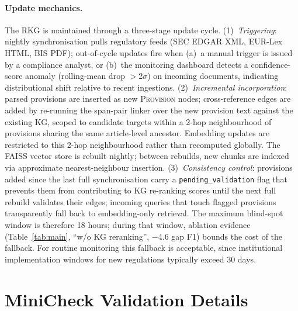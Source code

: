 \documentclass[11pt]{article}
\begin{document}
\paragraph{Update mechanics.}  The RKG is maintained through a three-stage update cycle. (1)~\emph{Triggering}: nightly synchronisation pulls regulatory feeds (SEC EDGAR XML, EUR-Lex HTML, BIS PDF); out-of-cycle updates fire when (a)~a manual trigger is issued by a compliance analyst, or (b)~the monitoring dashboard detects a confidence-score anomaly (rolling-mean drop $>$2$\sigma$) on incoming documents, indicating distributional shift relative to recent ingestions. (2)~\emph{Incremental incorporation}: parsed provisions are inserted as new \textsc{Provision} nodes; cross-reference edges are added by re-running the span-pair linker over the new provision text against the existing KG, scoped to candidate targets within a 2-hop neighbourhood of provisions sharing the same article-level ancestor. Embedding updates are restricted to this 2-hop neighbourhood rather than recomputed globally. The FAISS vector store is rebuilt nightly; between rebuilds, new chunks are indexed via approximate nearest-neighbour insertion. (3)~\emph{Consistency control}: provisions added since the last full synchronisation carry a \texttt{pending\_validation} flag that prevents them from contributing to KG re-ranking scores until the next full rebuild validates their edges; incoming queries that touch flagged provisions transparently fall back to embedding-only retrieval. The maximum blind-spot window is therefore 18 hours; during that window, ablation evidence (Table~\ref{tab:main}, ``w/o KG reranking'', $-$4.6 gap F1) bounds the cost of the fallback. For routine monitoring this fallback is acceptable, since institutional implementation windows for new regulations typically exceed 30 days.


\section{MiniCheck Validation Details}
\label{app:minicheck}
\end{document}
